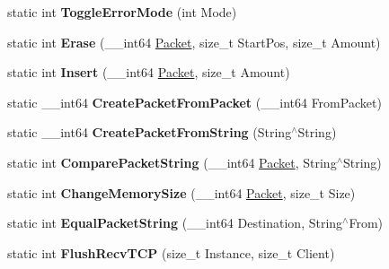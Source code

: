 \begin{DoxyCompactItemize}
\item 
\hypertarget{structmn_c_l_r_aa4978dd45568518e811ca0b369843876}{
static int {\bfseries ToggleErrorMode} (int Mode)}
\label{structmn_c_l_r_aa4978dd45568518e811ca0b369843876}

\item 
\hypertarget{structmn_c_l_r_a3032706d1e455fb081086cd1c45f2550}{
static int {\bfseries Erase} (\_\-\_\-int64 \hyperlink{class_packet}{Packet}, size\_\-t StartPos, size\_\-t Amount)}
\label{structmn_c_l_r_a3032706d1e455fb081086cd1c45f2550}

\item 
\hypertarget{structmn_c_l_r_a20953e00a30c093ddb7cba14526d4805}{
static int {\bfseries Insert} (\_\-\_\-int64 \hyperlink{class_packet}{Packet}, size\_\-t Amount)}
\label{structmn_c_l_r_a20953e00a30c093ddb7cba14526d4805}

\item 
\hypertarget{structmn_c_l_r_a3926fd541b3b2b2706b5e9e751587f46}{
static \_\-\_\-int64 {\bfseries CreatePacketFromPacket} (\_\-\_\-int64 FromPacket)}
\label{structmn_c_l_r_a3926fd541b3b2b2706b5e9e751587f46}

\item 
\hypertarget{structmn_c_l_r_a1a738b1cee1c1820cbba2969c648212f}{
static \_\-\_\-int64 {\bfseries CreatePacketFromString} (String$^\wedge$String)}
\label{structmn_c_l_r_a1a738b1cee1c1820cbba2969c648212f}

\item 
\hypertarget{structmn_c_l_r_ad092b9b3bfa960c63056d90e570f13c1}{
static int {\bfseries ComparePacketString} (\_\-\_\-int64 \hyperlink{class_packet}{Packet}, String$^\wedge$String)}
\label{structmn_c_l_r_ad092b9b3bfa960c63056d90e570f13c1}

\item 
\hypertarget{structmn_c_l_r_a78a07dea7b62ed76411d8685b62905fb}{
static int {\bfseries ChangeMemorySize} (\_\-\_\-int64 \hyperlink{class_packet}{Packet}, size\_\-t Size)}
\label{structmn_c_l_r_a78a07dea7b62ed76411d8685b62905fb}

\item 
\hypertarget{structmn_c_l_r_a2cd51130785858f8b02e00682fbc7c53}{
static int {\bfseries EqualPacketString} (\_\-\_\-int64 Destination, String$^\wedge$From)}
\label{structmn_c_l_r_a2cd51130785858f8b02e00682fbc7c53}

\item 
\hypertarget{structmn_c_l_r_a41137c355bf0f50eceefdbae85e975f1}{
static int {\bfseries FlushRecvTCP} (size\_\-t Instance, size\_\-t Client)}
\label{structmn_c_l_r_a41137c355bf0f50eceefdbae85e975f1}


\end{DoxyCompactItemize}
